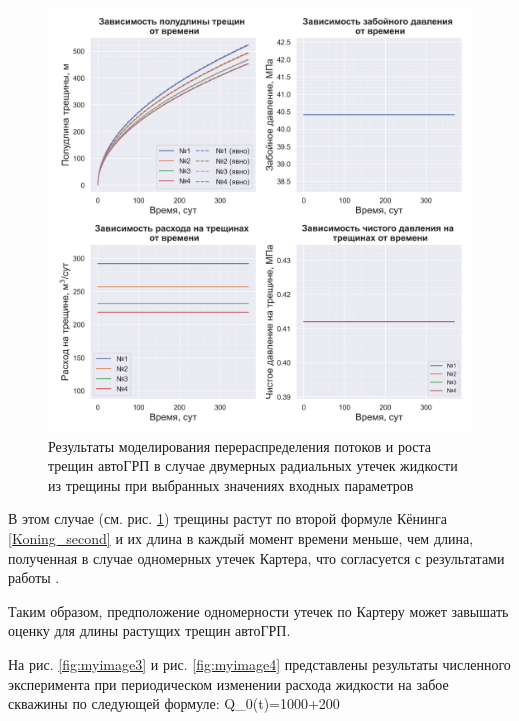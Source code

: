 \begin{figure}[H] 
\center
\includegraphics[width=.95\linewidth]{images/myimage2.jpg}
\caption{Результаты моделирования перераспределения потоков и роста трещин автоГРП в случае двумерных радиальных утечек жидкости из трещины при выбранных значениях входных параметров} 
\label{fig:myimage2}
\end{figure}

В этом случае (см. рис. \ref{fig:myimage2}) трещины растут по второй формуле Кёнинга \eqref{Koning_second} и их длина в каждый момент времени меньше, чем длина, полученная в случае одномерных утечек Картера, что согласуется с результатами работы \cite{hagoort}.

Таким образом, предположение одномерности утечек по Картеру \cite{karter} может завышать оценку для длины растущих трещин автоГРП.

На рис. \ref{fig:myimage3} и рис. \ref{fig:myimage4} представлены результаты численного эксперимента при периодическом изменении расхода жидкости на забое скважины по следующей формуле:
\vspace*{-5mm}
\beq
Q_0(t)=1000+200\cdot{}
\eeq

